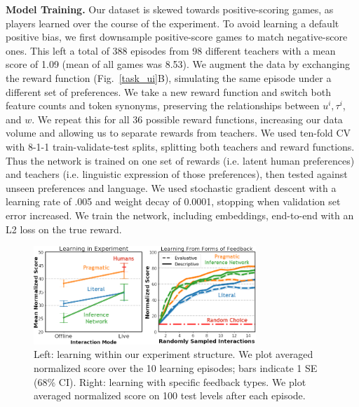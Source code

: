 \documentclass[letterpaper]{article} %
\begin{document}
\textbf{Model Training.} Our dataset is skewed towards positive-scoring games, as players learned over the course of the experiment. To avoid learning a default positive bias, we first downsample positive-score games to match negative-score ones. This left a total of 388 episodes from 98 different teachers with a mean score of 1.09 (mean of all games was 8.53). We augment the data by exchanging the reward function (Fig.~\ref{task_ui}B), simulating the same episode under a different set of preferences. We take a new reward function and switch both feature counts and token synonyms, preserving the relationships between $u^i, \tau^i$, and $w$. We repeat this for all 36 possible reward functions, increasing our data volume and allowing us to separate rewards from teachers. We used ten-fold CV with 8-1-1 train-validate-test splits, splitting both teachers and reward functions. Thus the network is trained on one set of rewards (i.e. latent human preferences) and teachers (i.e. linguistic expression of those preferences), then tested against unseen preferences and language. We used stochastic gradient descent with a learning rate of .005 and weight decay of 0.0001, stopping when validation set error increased. We train the network, including embeddings, end-to-end with an L2 loss on the true reward.

\begin{figure}[t]
\begin{center}
\includegraphics[width=8.4cm]{images/results_aaai.png}
\end{center}
\caption{Left: learning within our experiment structure. We plot averaged normalized score over the 10 learning episodes; bars indicate 1 SE (68\% CI). Right: learning with specific feedback types. We plot averaged normalized score on 100 test levels after each episode.}
\label{model_results_figure}
\end{figure}
\end{document}
